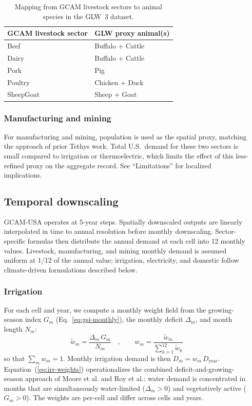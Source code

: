 \documentclass[fleqn,10pt]{wlscirep}
\begin{document}
\begin{table}[ht]
\centering
\begin{tabular}{ll}
\toprule
\textbf{GCAM livestock sector} & \textbf{GLW proxy animal(s)} \\
\midrule
Beef      & Buffalo + Cattle \\
Dairy     & Buffalo + Cattle \\
Pork      & Pig \\
Poultry   & Chicken + Duck \\
SheepGoat & Sheep + Goat \\
\bottomrule
\end{tabular}
\caption{Mapping from GCAM livestock sectors to animal species in the GLW~3 dataset.}
\label{tab:livestock}
\end{table}

\subsubsection*{Manufacturing and mining}

For manufacturing and mining, population is used as the spatial proxy, matching the approach of prior Tethys work\cite{Khan2023}. Total U.S.~demand for these two sectors is small compared to irrigation or thermoelectric, which limits the effect of this less-refined proxy on the aggregate record. See ``Limitations'' for localized implications.

\subsection*{Temporal downscaling}

GCAM-USA operates at 5-year steps. Spatially downscaled outputs are linearly interpolated in time to annual resolution before monthly downscaling. Sector-specific formulas then distribute the annual demand at each cell into 12 monthly values. Livestock, manufacturing, and mining monthly demand is assumed uniform at 1/12 of the annual value; irrigation, electricity, and domestic follow climate-driven formulations described below.

\subsubsection*{Irrigation}

For each cell and year, we compute a monthly weight field from the growing-season index $G_m$ (Eq.~\ref{eq:gsi-monthly}), the monthly deficit $\Delta_m$, and month length $N_m$:
\begin{equation}
\tilde{w}_m = \frac{\Delta_m \, G_m}{N_m}\quad, \qquad w_m = \frac{\tilde{w}_m}{\sum_{k=1}^{12}\tilde{w}_k}
\label{eq:irr-weights}
\end{equation}
so that $\sum_m w_m = 1$. Monthly irrigation demand is then $D_m = w_m \, D_{\mathrm{year}}$. Equation~(\ref{eq:irr-weights}) operationalizes the combined deficit-and-growing-season approach of Moore et al.\cite{Moore_2015} and Roy et al.\cite{Roy_2005}: water demand is concentrated in months that are simultaneously water-limited ($\Delta_m > 0$) and vegetatively active ($G_m > 0$). The weights are per-cell and differ across cells and years.
\end{document}
